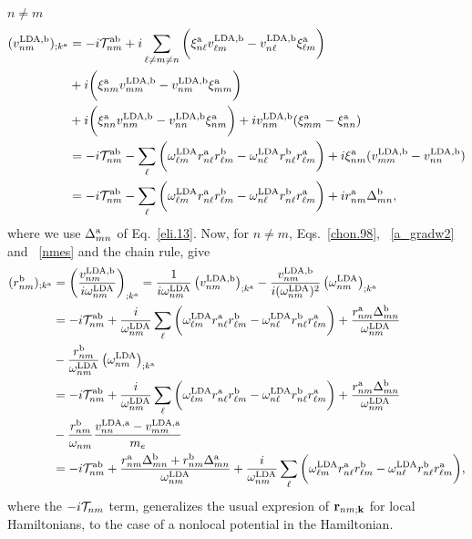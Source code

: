  $n\ne m$
\begin{align}\label{nmes}
(v^{\mathrm{LDA},\mathrm{b}}_{nm})_{;k^{\mathrm{a}}}&=
-i{\cal T}^{\mathrm{a}\mathrm{b}}_{nm}
+i  
\sum_{\ell\ne m\ne n}
\bigg(
\xi^{\mathrm{a}}_{n\ell} 
v^{\mathrm{LDA},\mathrm{b}}_{\ell m}
- 
v^{\mathrm{LDA},\mathrm{b}}_{n\ell}
\xi^{\mathrm{a}}_{\ell m}
\bigg)  
\nonumber\\
&+ 
i  
\bigg(
\xi^{\mathrm{a}}_{nm} 
v^{\mathrm{LDA},\mathrm{b}}_{mm}
- 
v^{\mathrm{LDA},\mathrm{b}}_{nm}
\xi^{\mathrm{a}}_{mm}
\bigg)  
\nonumber\\
&+ 
i  
\bigg(
\xi^{\mathrm{a}}_{nn} 
v^{\mathrm{LDA},\mathrm{b}}_{nm}
- 
v^{\mathrm{LDA},\mathrm{b}}_{nn}
\xi^{\mathrm{a}}_{nm}
\bigg)  
+i  
v^{\mathrm{LDA},\mathrm{b}}_{nm}(\xi^{\mathrm{a}}_{mm}
-
\xi^{\mathrm{a}}_{nn}
)  
\nonumber \\
&=
-i{\cal T}^{\mathrm{a}\mathrm{b}}_{nm}
-
\sum_{\ell}
\bigg(
\omega^{\mathrm{LDA}}_{\ell m} 
r^{\mathrm{a}}_{n\ell} 
r^{\mathrm{b}}_{\ell m}
-
\omega^{\mathrm{LDA}}_{n\ell} 
r^{\mathrm{b}}_{n\ell} 
r^{\mathrm{a}}_{\ell m}
\bigg)  
+i  
\xi^{\mathrm{a}}_{nm}
(v^{\mathrm{LDA},\mathrm{b}}_{mm}
- 
v^{\mathrm{LDA},\mathrm{b}}_{nn}
)  
\nonumber \\
&=
-i{\cal T}^{\mathrm{a}\mathrm{b}}_{nm}
-
\sum_{\ell}
\bigg(
\omega^{\mathrm{LDA}}_{\ell m}  
r^{\mathrm{a}}_{n\ell}  
r^{\mathrm{b}}_{\ell m}
-
\omega^{\mathrm{LDA}}_{n\ell}  
r^{\mathrm{b}}_{n\ell}  
r^{\mathrm{a}}_{\ell m}
\bigg)  
+i  
r^{\mathrm{a}}_{nm}
\Delta^{\mathrm{b}}_{mn}
,
\end{align}  
where we use $\Delta^{\mathrm{a}}_{mn}$ of Eq.~\eqref{eli.13}.
Now, for $n \ne m$, Eqs.~\eqref{chon.98},
~\eqref{a_gradw2} and 
~\eqref{nmes} and the chain rule, give
\begin{align}\label{na_rgendevn}
(r^{\mathrm{b}}_{nm})_{;k^{\mathrm{a}}}
&=\left(\frac{v^{\mathrm{LDA},\mathrm{b}}_{nm}}{i\omega^{\mathrm{LDA}}_{nm}}\right)_{;k^{\mathrm{a}}}
=
\frac{1}
{i\omega^{\mathrm{LDA}}_{nm}}
\left( 
v^{\mathrm{LDA},\mathrm{b}}_{nm}
\right)_{;k^{\mathrm{a}}}
-
\frac{v^{\mathrm{LDA},\mathrm{b}}_{nm}}
{i(\omega^{\mathrm{LDA}}_{nm})^2}
\left(
\omega^{\mathrm{LDA}}_{nm}
\right)_{;k^{\mathrm{a}}}
\nonumber \\
&=
-i{\cal T}^{\mathrm{a}\mathrm{b}}_{nm}
+
\frac{i}{\omega^{\mathrm{LDA}}_{nm}}
\sum_{\ell}
\bigg(
\omega^{\mathrm{LDA}}_{\ell m} 
r^{\mathrm{a}}_{n\ell} 
r^{\mathrm{b}}_{\ell m}
-
\omega^{\mathrm{LDA}}_{n\ell} 
r^{\mathrm{b}}_{n\ell} 
r^{\mathrm{a}}_{\ell m}
\bigg)
+
\frac{r^{\mathrm{a}}_{nm}
\Delta^{\mathrm{b}}_{mn}}
{\omega^{\mathrm{LDA}}_{nm}}
\nonumber \\
&
-
\frac{r^{\mathrm{b}}_{nm}}
{\omega^{\mathrm{LDA}}_{nm}}
\left(
\omega^{\mathrm{LDA}}_{nm}
\right)_{;k^{\mathrm{a}}}
\nonumber \\
&=
-i{\cal T}^{\mathrm{a}\mathrm{b}}_{nm}
+
\frac{i}{\omega^{\mathrm{LDA}}_{nm}}
\sum_{\ell}
\bigg(
\omega^{\mathrm{LDA}}_{\ell m} 
r^{\mathrm{a}}_{n\ell} 
r^{\mathrm{b}}_{\ell m}
-
\omega^{\mathrm{LDA}}_{n\ell} 
r^{\mathrm{b}}_{n\ell} 
r^{\mathrm{a}}_{\ell m}
\bigg)
+
\frac{r^{\mathrm{a}}_{nm}
\Delta^{\mathrm{b}}_{mn}}
{\omega^{\mathrm{LDA}}_{nm}}
\nonumber \\
&
-
\frac{r^{\mathrm{b}}_{nm}}
{\omega_{nm}}
\frac{v^{\mathrm{LDA},\mathrm{a}}_{nn}-v^{\mathrm{LDA},\mathrm{a}}_{mm}}{m_e}
\nonumber \\
&=
-i{\cal T}^{\mathrm{a}\mathrm{b}}_{nm}
+
\frac{ 
r^{\mathrm{a}}_{nm}
\Delta^{\mathrm{b}}_{mn}
+r^{\mathrm{b}}_{nm}
\Delta^{\mathrm{a}}_{mn}
}
{\omega^{\mathrm{LDA}}_{nm}}
+
\frac{i}{\omega^{\mathrm{LDA}}_{nm}}
\sum_{\ell}
\bigg(
\omega^{\mathrm{LDA}}_{\ell m} 
r^{\mathrm{a}}_{n\ell} 
r^{\mathrm{b}}_{\ell m}
-
\omega^{\mathrm{LDA}}_{n\ell} 
r^{\mathrm{b}}_{n\ell} 
r^{\mathrm{a}}_{\ell m}
\bigg)
,
\end{align} 
where the $-i{\cal T}_{nm}$ term, generalizes the usual expresion of
$\mathbf{r}_{nm;\mathbf{k}}$ for local 
Hamiltonians,\cite{aversaPRB95,nastosPRB05,cabellosPRB09,rashkeevPRB98}
to
the case of a
nonlocal potential in the Hamiltonian.
